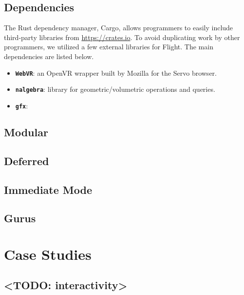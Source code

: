 \documentclass[conference,12pt]{IEEEtran}
\begin{document}

\subsection{Dependencies}
The Rust dependency manager, Cargo, allows programmers to easily include
third-party libraries from \url{https://crates.io}. To avoid duplicating work
by other programmers, we utilized a few external libraries for Flight. The main
dependencies are listed below.
\begin{itemize}
    \item \textbf{\texttt{WebVR}}: an OpenVR wrapper built by Mozilla for the
        Servo browser.
    \item \textbf{\texttt{nalgebra}}: library for geometric/volumetric
        operations and queries.
    \item \textbf{\texttt{gfx}}: %
\end{itemize}

\subsection{Modular}

\subsection{Deferred}

\subsection{Immediate Mode}

\subsection{Gurus} %


\section{Case Studies}\label{sec:case-studies}

\subsection{<TODO: interactivity>}
\end{document}
